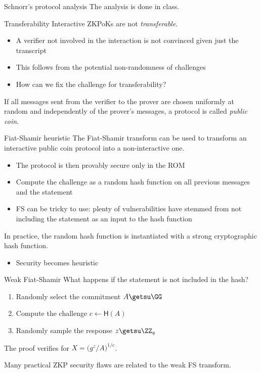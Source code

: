 \begin{frame}{Schnorr's protocol analysis}
  The analysis is done in class.
\end{frame}

\begin{frame}{Transferability}
  Interactive ZKPoKs are not \emph{transferable}.
  \begin{itemize}
    \item A verifier not involved in the interaction is not convinced given just the transcript
    \item This follows from the potential non-randomness of challenges
    \item How can we fix the challenge for transferability?
  \end{itemize}

  \vspace*{1em}

  \pause
  If all messages sent from the verifier to the prover are chosen uniformly at random and independently of the prover's messages, a protocol is called \emph{public coin}.
\end{frame}

\begin{frame}{Fiat-Shamir heuristic}
  The Fiat-Shamir transform can be used to transform an interactive public coin protocol into a non-interactive one.
  \begin{itemize}[<+(1)->]
    \item The protocol is then provably secure only in the ROM
    \item Compute the challenge as a random hash function on all previous messages and the statement
    \item FS can be tricky to use: plenty of vulnerabilities have stemmed from not including the statement as an input to the hash function
  \end{itemize}

  \pause
  In practice, the random hash function is instantiated with a strong cryptographic hash function.
  \begin{itemize}[<+(1)->]
    \item Security becomes heuristic
  \end{itemize}
\end{frame}

\begin{frame}{Weak Fiat-Shamir}
  What happens if the statement is not included in the hash?

  \begin{enumerate}[<+(1)->]
    \item Randomly select the commitment $A \getsu \GG$
    \item Compute the challenge $c \gets \mathsf{H}(A)$
    \item Randomly sample the response $z \getsu \ZZ_q$
  \end{enumerate}

  \pause
  The proof verifies for $X = \bigl(g^z/A\bigr)^{1/c}$.

  \vspace*{1em}

  \pause
  Many practical ZKP security flaws are related to the weak FS transform.
\end{frame}


